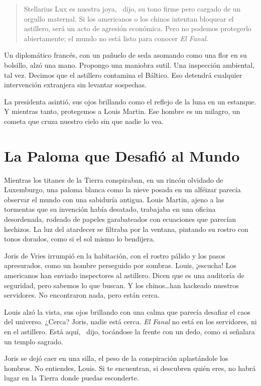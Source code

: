 \begin{quote}
\calli
\glqq Stellarius Lux es nuestra joya,\grqq~ dijo, su tono firme pero cargado de un orgullo maternal. \glqq Si los americanos o los chinos intentan bloquear el astillero, será un acto de agresión económica. Pero no podemos protegerlo abiertamente; el mundo no está listo para conocer \emph{El Fanal}.\grqq
\end{quote}

Un diplomático francés, con un pañuelo de seda asomando como una flor en su bolsillo, alzó una mano. \glqq Propongo una maniobra sutil. Una inspección ambiental, tal vez. Decimos que el astillero contamina el Báltico. Eso detendrá cualquier intervención extranjera sin levantar sospechas.\grqq

La presidenta asintió, sus ojos brillando como el reflejo de la luna en un estanque. \glqq Y mientras tanto, protegemos a Louis Martin. Ese hombre es un milagro, un cometa que cruza nuestro cielo sin que nadie lo vea.\grqq

\section{La Paloma que Desafió al Mundo}

Mientras los titanes de la Tierra conspiraban, en un rincón olvidado de Luxemburgo, una paloma blanca como la nieve posada en un alféizar parecía observar el mundo con una sabiduría antigua. Louis Martin, ajeno a las tormentas que su invención había desatado, trabajaba en una oficina desordenada, rodeado de papeles garabateados con ecuaciones que parecían hechizos. La luz del atardecer se filtraba por la ventana, pintando su rostro con tonos dorados, como si el sol mismo lo bendijera.

Joris de Vries irrumpió en la habitación, con el rostro pálido y los pasos apresurados, como un hombre perseguido por sombras. \glqq Louis, ¡escucha! Los americanos han enviado inspectores al astillero. Dicen que es una auditoría de seguridad, pero sabemos lo que buscan. Y los chinos\ldots han hackeado nuestros servidores. No encontraron nada, pero están cerca.\grqq

Louis alzó la vista, sus ojos brillando con una calma que parecía desafiar el caos del universo. \glqq ¿Cerca? Joris, nadie está cerca. \emph{El Fanal} no está en los servidores, ni en el astillero. Está aquí,\grqq~ dijo, tocándose la frente con un dedo, como si señalara un templo sagrado.

Joris se dejó caer en una silla, el peso de la conspiración aplastándole los hombros. \glqq No entiendes, Louis. Si te encuentran, si descubren quién eres, no habrá lugar en la Tierra donde puedas esconderte.\grqq

